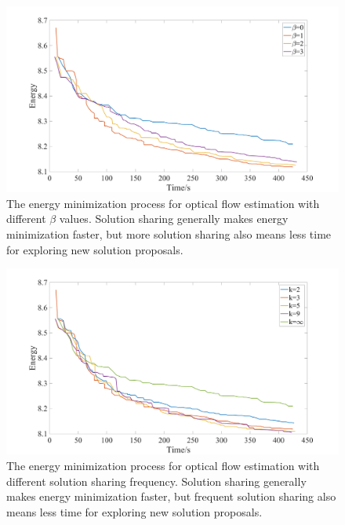 \begin{figure}[tb]
  \includegraphics[width=\columnwidth]{figure/optical_flow_by_beta.png}
  \caption{The energy minimization process for optical flow estimation with different $\beta$ values. Solution sharing generally makes energy minimization faster, but more solution sharing also means less time for exploring new solution proposals.}\label{fig:optical_flow_by_beta}
\end{figure}
\begin{figure}[tb]
  \includegraphics[width=\columnwidth]{figure/optical_flow_by_interval.png}
  \caption{The energy minimization process for optical flow estimation with different solution sharing frequency. Solution sharing generally makes energy minimization faster, but frequent solution sharing also means less time for exploring new solution proposals.}\label{fig:optical_flow_by_beta}\label{fig:optical_flow_by_interval}
\end{figure}

